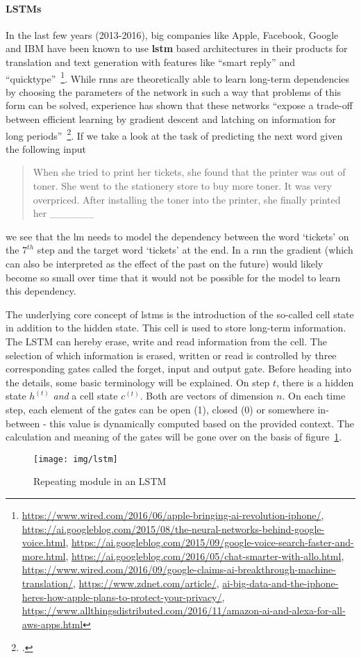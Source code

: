 \paragraph{LSTMs}
In the last few years (2013-2016), big companies like Apple, Facebook, Google and IBM have been known to use \textbf{\gls{lstm}} based architectures in their products for translation and text generation with features like “smart reply” and “quicktype”~\footnote{\url{https://www.wired.com/2016/06/apple-bringing-ai-revolution-iphone/}, \url{https://ai.googleblog.com/2015/08/the-neural-networks-behind-google-voice.html}, \url{https://ai.googleblog.com/2015/09/google-voice-search-faster-and-more.html}, \url{https://ai.googleblog.com/2016/05/chat-smarter-with-allo.html}, \url{https://www.wired.com/2016/09/google-claims-ai-breakthrough-machine-translation/}, \url{https://www.zdnet.com/article/}, \url{ai-big-data-and-the-iphone-heres-how-apple-plans-to-protect-your-privacy/}, \url{https://www.allthingsdistributed.com/2016/11/amazon-ai-and-alexa-for-all-aws-apps.html}}. While \gls{rnn}s are theoretically able to learn long-term dependencies by choosing the parameters of the network in such a way that problems of this form can be solved, experience has shown that these networks ``expose a trade-off between efficient learning by gradient descent and latching on information for long periods''~\footcite{279181}. If we take a look at the task of predicting the next word given the following input
\begin{quote}
	When she tried to print her tickets, she found that the printer was out of toner. She went to the stationery store to buy more toner. It was very overpriced. After installing the toner into the printer, she finally printed her \_\_\_\_\_\_
\end{quote}
we see that the \gls{lm} needs to model the dependency between the word `tickets' on the $ 7^{th} $ step and the target word `tickets' at the end. In a \gls{rnn} the gradient (which can also be interpreted as the effect of the past on the future) would likely become so small over time that it would not be possible for the model to learn this dependency.

The underlying core concept of \gls{lstm}s is the introduction of the so-called cell state in addition to the hidden state. This cell is used to store long-term information. The LSTM can hereby erase, write and read information from the cell. The selection of which information is erased, written or read is controlled by three corresponding gates called the forget, input and output gate. Before heading into the details, some basic terminology will be explained. On step $ t $, there is a hidden state $ h^{(t)} $ \textit{and} a cell state $ c^{(t)} $. Both are vectors of dimension $ n $. On each time step, each element of the gates can be open (1), closed (0) or somewhere in-between - this value is dynamically computed based on the provided context. The calculation and meaning of the gates will be gone over on the basis of figure~\ref{fig:lstm_architecture}.
\begin{figure}
  	\texttt{[image: img/lstm]}
  	\caption{Repeating module in an LSTM}
	\label{fig:lstm_architecture}
\end{figure}

